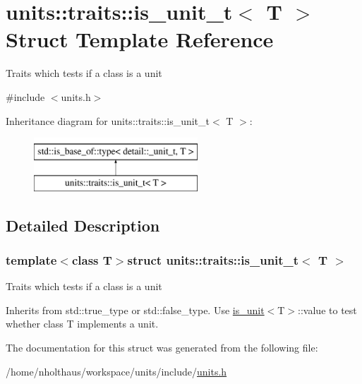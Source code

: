 \hypertarget{structunits_1_1traits_1_1is__unit__t}{}\section{units\+:\+:traits\+:\+:is\+\_\+unit\+\_\+t$<$ T $>$ Struct Template Reference}
\label{structunits_1_1traits_1_1is__unit__t}


Traits which tests if a class is a {\ttfamily unit}  




{\ttfamily \#include $<$units.\+h$>$}

Inheritance diagram for units\+:\+:traits\+:\+:is\+\_\+unit\+\_\+t$<$ T $>$\+:\begin{figure}[H]
\begin{center}
\leavevmode
\includegraphics[height=2.000000cm]{structunits_1_1traits_1_1is__unit__t}
\end{center}
\end{figure}


\subsection{Detailed Description}
\subsubsection*{template$<$class T$>$struct units\+::traits\+::is\+\_\+unit\+\_\+t$<$ T $>$}

Traits which tests if a class is a {\ttfamily unit} 

Inherits from {\ttfamily std\+::true\+\_\+type} or {\ttfamily std\+::false\+\_\+type}. Use {\ttfamily \hyperlink{structunits_1_1traits_1_1is__unit}{is\+\_\+unit}$<$T$>$\+::value} to test whether {\ttfamily class T} implements a {\ttfamily unit}. 

The documentation for this struct was generated from the following file\+:\begin{DoxyCompactItemize}
\item 
/home/nholthaus/workspace/units/include/\hyperlink{units_8h}{units.\+h}\end{DoxyCompactItemize}
